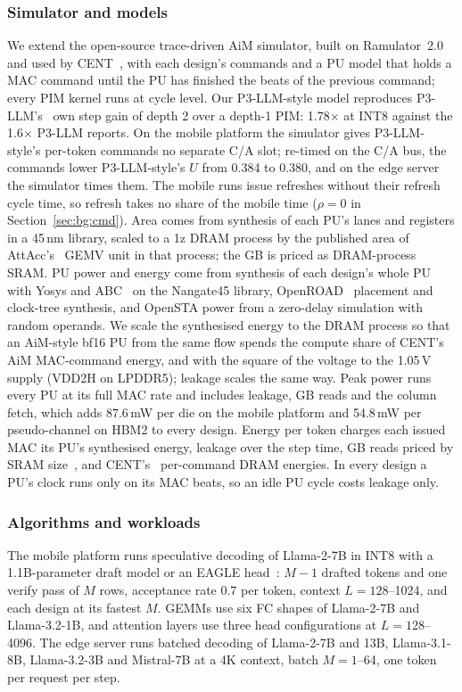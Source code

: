 \subsubsection{Simulator and models}
We extend the open-source trace-driven AiM simulator, built on Ramulator~2.0~\cite{ramulator2} and used by
CENT~\cite{cent}, with each design's commands and a PU model that holds a MAC command until the PU has finished the
beats of the previous command; every PIM kernel runs at cycle level. Our P3-LLM-style model reproduces
P3-LLM's~\cite{p3llm} own step gain of depth 2 over a depth-1 PIM: 1.78$\times$ at INT8 against the 1.6$\times$ P3-LLM
reports. On the mobile platform the simulator gives P3-LLM-style's per-token commands no separate C/A slot;
re-timed on the C/A bus, the commands lower P3-LLM-style's $U$ from 0.384 to 0.380, and on the edge server the
simulator times them. The mobile runs issue refreshes without their refresh cycle time, so refresh takes no share of
the mobile time ($\rho = 0$ in Section~\ref{sec:bg:cmd}). Area comes from synthesis of each PU's lanes and registers in a 45\,nm library, scaled to a 1z DRAM process by
the published area of AttAcc's~\cite{attacc} GEMV unit in that process; the GB is priced as DRAM-process
SRAM\ASSUMPTION. PU power and energy come from synthesis of each design's whole PU with Yosys and ABC~\cite{abc} on the
Nangate45 library, OpenROAD~\cite{openroad} placement and clock-tree synthesis, and OpenSTA power from a zero-delay
simulation with random operands. We scale the synthesised energy to the DRAM process so that an AiM-style bf16 PU from
the same flow spends the compute share of CENT's~\cite{cent} AiM MAC-command energy, and with the square of the voltage
to the 1.05\,V supply (VDD2H on LPDDR5); leakage scales the same way\ASSUMPTION. Peak power runs every PU at its full
MAC rate and includes leakage, GB reads and the column fetch, which adds 87.6\,mW per die on the mobile platform and
54.8\,mW per pseudo-channel on HBM2 to every design. Energy per token charges each issued MAC its PU's synthesised energy,
leakage over the step time, GB reads priced by SRAM size~\cite{horowitz}, and CENT's~\cite{cent} per-command DRAM
energies. In every design a PU's clock runs only on its MAC beats, so an idle PU cycle costs leakage
only\ASSUMPTION.

\subsubsection{Algorithms and workloads}
The mobile platform runs speculative decoding of Llama-2-7B in INT8 with a 1.1B-parameter draft model or an EAGLE
head~\cite{eagle}: $M - 1$ drafted tokens and one verify pass of $M$ rows, acceptance rate 0.7 per token, context
$L = 128$--1024, and each design at its fastest $M$. GEMMs use six FC shapes of Llama-2-7B and Llama-3.2-1B, and attention layers use three head configurations at $L = 128$--4096. The edge server runs batched decoding of Llama-2-7B
and 13B, Llama-3.1-8B, Llama-3.2-3B and Mistral-7B at a 4K context, batch $M = 1$--64, one token per request per step.

